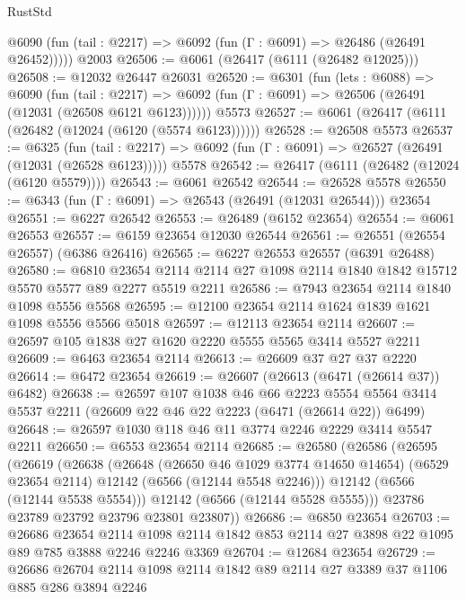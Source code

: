 \begin{lexlean}{RustStd}
\begin{coremodule}
{\begin{coremodule}
{{{{{{{{{{{{{{{{{{{{{{{{{{      @6090 (fun (tail : @2217) => @6092 (fun (Γ : @6091) => @26486 (@26491 @26452)))))
    @2003
@26506 := @6061 (@26417 (@6111 (@26482 @12025)))
@26508 := @12032 @26447 @26031
@26520 := @6301
    (fun (lets : @6088) =>
    @6090
      (fun (tail : @2217) =>
      @6092 (fun (Γ : @6091) => @26506 (@26491 (@12031 (@26508 @6121 @6123))))))
    @5573
@26527 := @6061 (@26417 (@6111 (@26482 (@12024 (@6120 (@5574 @6123))))))
@26528 := @26508 @5573
@26537 := @6325
    (fun (tail : @2217) => @6092 (fun (Γ : @6091) => @26527 (@26491 (@12031 (@26528 @6123)))))
    @5578
@26542 := @26417 (@6111 (@26482 (@12024 (@6120 @5579))))
@26543 := @6061 @26542
@26544 := @26528 @5578
@26550 := @6343 (fun (Γ : @6091) => @26543 (@26491 (@12031 @26544))) @23654
@26551 := @6227 @26542
@26553 := @26489 (@6152 @23654)
@26554 := @6061 @26553
@26557 := @6159 @23654 @12030 @26544
@26561 := @26551 (@26554 @26557) (@6386 @26416)
@26565 := @6227 @26553 @26557 (@6391 @26488)
@26580 := @6810
    @23654
    @2114
    @2114
    @27
    @1098
    @2114
    @1840
    @1842
    @15712
    @5570
    @5577
    @89
    @2277
    @5519
    @2211
@26586 := @7943 @23654 @2114 @1840 @1098 @5556 @5568
@26595 := @12100 @23654 @2114 @1624 @1839 @1621 @1098 @5556 @5566 @5018
@26597 := @12113 @23654 @2114
@26607 := @26597 @105 @1838 @27 @1620 @2220 @5555 @5565 @3414 @5527 @2211
@26609 := @6463 @23654 @2114
@26613 := @26609 @37 @27 @37 @2220
@26614 := @6472 @23654
@26619 := @26607 (@26613 (@6471 (@26614 @37)) @6482)
@26638 := @26597
    @107
    @1038
    @46
    @66
    @2223
    @5554
    @5564
    @3414
    @5537
    @2211
    (@26609 @22 @46 @22 @2223 (@6471 (@26614 @22)) @6499)
@26648 := @26597 @1030 @118 @46 @11 @3774 @2246 @2229 @3414 @5547 @2211
@26650 := @6553 @23654 @2114
@26685 := @26580
    (@26586
      (@26595
        (@26619
          (@26638
            (@26648
              (@26650 @46 @1029 @3774 @14650 @14654)
              (@6529 @23654 @2114)
              @12142
              (@6566 (@12144 @5548 @2246)))
            @12142
            (@6566 (@12144 @5538 @5554)))
          @12142
          (@6566 (@12144 @5528 @5555)))
        @23786
        @23789
        @23792
        @23796
        @23801
        @23807))
@26686 := @6850 @23654
@26703 := @26686
    @23654
    @2114
    @1098
    @2114
    @1842
    @853
    @2114
    @27
    @3898
    @22
    @1095
    @89
    @785
    @3888
    @2246
    @2246
    @3369
@26704 := @12684 @23654
@26729 := @26686
    @26704
    @2114
    @1098
    @2114
    @1842
    @89
    @2114
    @27
    @3389
    @37
    @1106
    @885
    @286
    @3894
    @2246
}}}}}}}}}}}}}}}}}}}}}}}}}}
\end{coremodule}}
\end{coremodule}
\end{lexlean}

